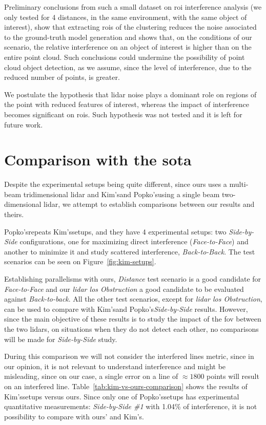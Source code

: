 Preliminary conclusions from such a small dataset on \ac{roi} interference analysis (we only tested for 4 distances, in the same environment, with the same object of interest), show that extracting \acp{roi} of the clustering reduces the noise associated to the ground-truth model generation and shows that, on the conditions of our scenario, the relative interference on an object of interest is higher than on the entire point cloud. Such conclusions could undermine the possibility of point cloud object detection, as we assume, since the level of interference, due to the reduced number of points, is greater.

We postulate the hypothesis that \ac{lidar} noise plays a dominant role on regions of the point with reduced features of interest, whereas the impact of interference becomes significant on \acp{roi}. Such hypothesis was not tested and it is left for future work.


\section{Comparison with the \acl{sota}}
\label{sec:lidar-interference:sota-comparison}
Despite the experimental setups being quite different, since ours uses a multi-beam tridimensional \ac{lidar} and Kim's\etal and Popko's\etal using a single beam two-dimensional \ac{lidar}, we attempt to establish comparisons between our results and theirs.

Popko's\etal repeats Kim's\etal setups, and they have 4 experimental setups: two \textit{Side-by-Side} configurations, one for maximizing direct interference (\textit{Face-to-Face}) and another to minimize it and study scattered interference, \textit{Back-to-Back}. The test scenarios can be seen on Figure~\ref{fig:kim-setups}. 

Establishing parallelisms with ours, \textit{Distance} test scenario is a good candidate for \textit{Face-to-Face} and our \textit{\ac{lidar} \ac{los} Obstruction} a good candidate to be evaluated against \textit{Back-to-back}. All the other test scenarios, except for \textit{\ac{lidar} \ac{los} Obstruction}, can be used to compare with Kim's\etal and Popko's\etal \textit{Side-by-Side} results. However, since the main objective of these results is to study the impact of the \ac{fov} between the two \acp{lidar}, on situations when they do not detect each other, no comparisons will be made for \textit{Side-by-Side} study.


During this comparison we will not consider the interfered lines metric, since in our opinion, it is not relevant to understand interference and might be misleading, since on our case, a single error on a line of $\approx 1800$ points will result on an interfered line. Table~\ref{tab:kim-vs-ours-comparison} shows the results of Kim's\etal setups versus ours. Since only one of Popko's\etal setups has experimental quantitative measurements: \textit{Side-by-Side \#1} with 1.04\% of interference, it is not possibility to compare with ours' and Kim's\etal.


